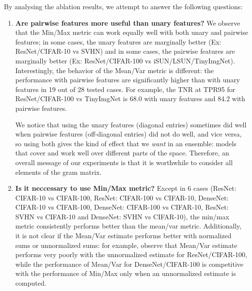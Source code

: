 \documentclass{article}
\begin{document}
By analysing the ablation results, we attempt to answer the following questions:
\begin{enumerate}
    \item \textbf{Are pairwise features more useful than unary features?} We observe that the Min/Max metric can work equally well with both unary and pairwise features; in some cases, the unary features are marginally better (Ex: ResNet/CIFAR-10 vs SVHN) and in some cases, the pairwise features are marginally better (Ex: ResNet/CIFAR-100 vs iSUN/LSUN/TinyImgNet). Interestingly, the behavior of the Mean/Var metric is different: the performance with pairwise features are significantly higher than with unary features in 19 out of 28 tested cases. For example, the TNR at TPR95 for ResNet/CIFAR-100 vs TinyImgNet is 68.0 with unary features and 84.2 with pairwise features.

    We notice that using the unary features (diagonal entries) sometimes did well when pairwise features (off-diagonal entries) did not do well, and vice versa, so using both gives the kind of effect that we \textit{want} in an ensemble: models that cover and work well over different parts of the space. Therefore, an overall message of our experiments is that it is worthwhile to consider all elements of the gram matrix.

    \item \textbf{Is it neccessary to use Min/Max metric?} Except in 6 cases (ResNet:  CIFAR-10 vs CIFAR-100, ResNet: CIFAR-100 vs CIFAR-10, DenseNet: CIFAR-10 vs CIFAR-100, DenseNet:  CIFAR-100 vs CIFAR-10, ResNet: SVHN vs CIFAR-10 and DenseNet: SVHN vs CIFAR-10), the min/max metric consistently performs better than the mean/var metric. Additionally, it is not clear if the Mean/Var estimate performs better with normalized sums or unnormalized sums: for example, observe that Mean/Var estimate performs very poorly with the unnormalized estimate for ResNet/CIFAR-100, while the performance of Mean/Var for DenseNet/CIFAR-100 is competitive with the performance of Min/Max only when an unnormalized estimate is computed.


\end{enumerate}
\end{document}
